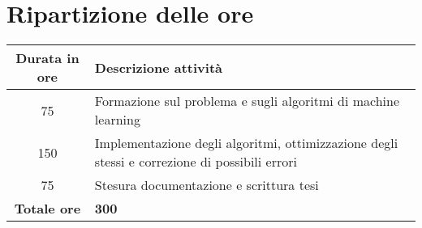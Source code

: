 \section{Ripartizione delle ore}
\begin{tabular}{|c|p{14cm}|}
\hline
\textbf{Durata in ore} & \textbf{Descrizione attività} \\ \hline
75 & Formazione sul problema e sugli algoritmi di machine learning \\ \hline
150 & Implementazione degli algoritmi, ottimizzazione degli stessi e correzione di possibili errori \\ \hline
75 & Stesura documentazione e scrittura tesi \\ \hline
\textbf{Totale ore} & \textbf{300} \\ \hline
\end{tabular}
